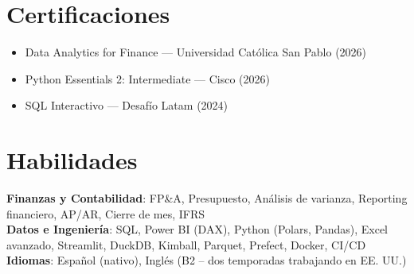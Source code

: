 \documentclass[letterpaper,10pt]{article}
\newcommand{\resumeItem}[1]{
  \item\small{
    {#1 \vspace{-2pt}}
  }
}
\newcommand{\resumeSubHeadingListStart}{\begin{itemize}[leftmargin=0.15in, label={}]}
\newcommand{\resumeSubHeadingListEnd}{\end{itemize}}
\begin{document}
\section{Certificaciones}
  \resumeSubHeadingListStart
    \resumeItem{Data Analytics for Finance --- Universidad Cat\'olica San Pablo (2026)}
    \resumeItem{Python Essentials 2: Intermediate --- Cisco (2026)}
    \resumeItem{SQL Interactivo --- Desaf\'io Latam (2024)}
  \resumeSubHeadingListEnd


\section{Habilidades}
 \begin{itemize}[leftmargin=0.15in, label={}]
    \small{\item{
     \textbf{Finanzas y Contabilidad}{: FP\&A, Presupuesto, An\'alisis de varianza, Reporting financiero, AP/AR, Cierre de mes, IFRS} \\
     \textbf{Datos e Ingenier\'ia}{: SQL, Power BI (DAX), Python (Polars, Pandas), Excel avanzado, Streamlit, DuckDB, Kimball, Parquet, Prefect, Docker, CI/CD} \\
     \textbf{Idiomas}{: Espa\~nol (nativo), Ingl\'es (B2 -- dos temporadas trabajando en EE. UU.)}
    }}
 \end{itemize}


\end{document}
